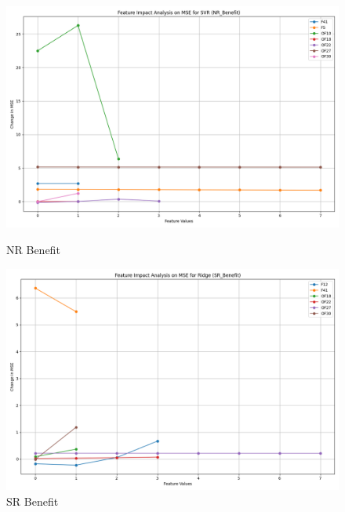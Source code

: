 \begin{figure}[H]
    \centering
    \begin{minipage}{0.495\textwidth}
        \centering
        \includegraphics[width=\linewidth]{analysis/images_reg/feature_impact_mse_NR_Benefit_SVR.png}
        \caption{NR Benefit}
        \label{fig:nr_ben_mse_analysis}
    \end{minipage}\hfill
    \begin{minipage}{0.495\textwidth}
        \centering
        \includegraphics[width=\linewidth]{analysis/images_reg/feature_impact_mse_SR_Benefit_Ridge.png}
        \caption{SR Benefit}
        \label{fig:sr_ben_mse_analysis}
    \end{minipage}
\end{figure}


